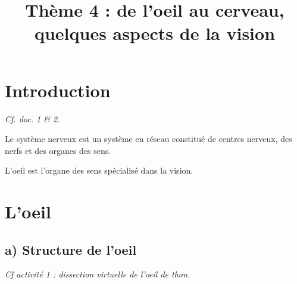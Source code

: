 \documentclass[12pt]{article}
\title{\textbf{Thème 4 : de l'oeil au cerveau, quelques aspects de la vision}}
\date{}
\begin{document}
\maketitle

\section*{Introduction}

\textit{Cf. doc. 1 \& 2.}

Le système nerveux est un système en réseau constitué de centres nerveux, des nerfs et des organes des sens.

L'oeil est l'organe des sens spécialisé dans la vision.

\section{L'oeil}

\subsection*{a) Structure de l'oeil}

\textit{Cf activité 1 : dissection virtuelle de l'oeil de thon.}
\end{document}
